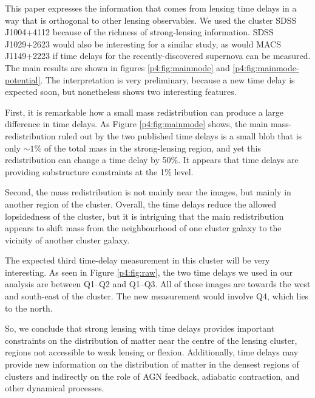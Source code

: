 \documentclass[
  11pt,
  twoside,
  openright,
  titlepage,
  headings=optiontoheadandtoc
]{scrbook}
\begin{document}
This paper expresses the information that comes from lensing time
delays in a way that is orthogonal to other lensing observables.  We
used the cluster SDSS J1004+4112 because of the richness of
strong-lensing information.  SDSS J1029+2623
\citep{2013ApJ...764..186F,2013MNRAS.429..482O} would also be
interesting for a similar study, as would MACS J1149+2223
\citep{2014arXiv1411.6009K,2014arXiv1411.6443O} if time delays for the
recently-discovered supernova can be measured.  The main results are
shown in figures \ref{p4:fig:mainmode} and \ref{p4:fig:mainmode-potential}.
The interpretation is very preliminary, because a new time delay is
expected soon, but nonetheless shows two interesting features.

First, it is remarkable how a small mass redistribution can produce a
large difference in time delays.  As Figure \ref{p4:fig:mainmode} shows,
the main mass-redistribution ruled out by the two published time
delays is a small blob that is only $\sim1\%$ of the total mass in the
strong-lensing region, and yet this redistribution can change a time
delay by 50\%.  It appears that time delays are providing substructure
constraints at the 1\% level.  

Second, the mass redistribution is not mainly near the images, but
mainly in another region of the cluster.  Overall, the time delays
reduce the allowed lopsidedness of the cluster, but it is intriguing
that the main redistribution appears to shift mass from the
neighbourhood of one cluster galaxy to the vicinity of another cluster
galaxy.

The expected third time-delay measurement in this cluster will be very
interesting. As seen in Figure \ref{p4:fig:raw}, the two time delays we used
in our analysis are between Q1--Q2 and Q1--Q3. All of these images are
towards the west and south-east of the cluster.  The new measurement
would involve Q4, which lies to the north.

So, we conclude that strong lensing with time delays provides important
constraints on the distribution of matter near the centre of the
lensing cluster, regions not accessible to weak lensing or flexion.
Additionally, time delays may provide new information on the 
distribution of matter in the
densest regions of clusters and indirectly on the role of AGN feedback,
adiabatic contraction, and other dynamical processes.

\end{document}
